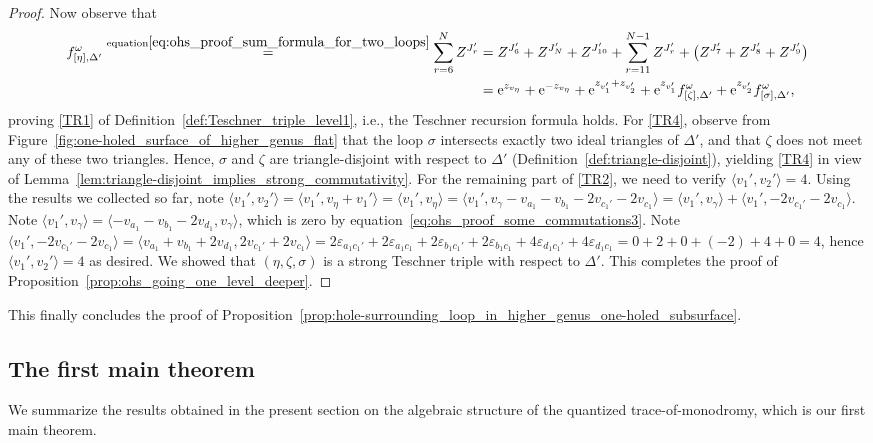 \documentclass[10pt,a4paper]{amsart}
\numberwithin{equation}{section}
\theoremstyle{definition}
\begin{document}
\begin{proof}
Now observe that
\begin{align*}
f^\omega_{[\eta],\Delta'} \stackrel{{\rm equation} \eqref{eq:ohs_proof_sum_formula_for_two_loops}}{=}
\sum_{r=6}^{N} Z^{J_r'}
& = Z^{J_6'} + Z^{J_N'} +Z^{J_{10}'} + \sum_{r=11}^{N-1} Z^{J_r'} + \bigl(Z^{J_7'} + Z^{J_8'} + Z^{J_9'}\bigr)
 \\
& = {\rm e}^{z_{v_\eta}} + {\rm e}^{-z_{v_\eta}} + {\rm e}^{z_{v_1'} + z_{v_2'}} + {\rm e}^{z_{v_1'}} f^\omega_{[\zeta],\Delta'} + {\rm e}^{z_{v_2'}} f^\omega_{[\sigma],\Delta'},
\end{align*}
proving \ref{TR1} of Definition~\ref{def:Teschner_triple_level1}, i.e., the Teschner recursion formula holds.
For \ref{TR4}, observe from Figure~\ref{fig:one-holed_surface_of_higher_genus_flat} that the loop $\sigma$ intersects exactly two ideal triangles of $\Delta'$, and that $\zeta$ does not meet any of these two triangles. Hence, $\sigma$ and $\zeta$ are triangle-disjoint with respect to $\Delta'$ (Definition~\ref{def:triangle-disjoint}), yielding \ref{TR4} in view of Lemma~\ref{lem:triangle-disjoint_implies_strong_commutativity}.
For the remaining part of \ref{TR2}, we need to verify $\langle v_1' , v_2'\rangle=4$. Using the results we collected so far, note $\langle v_1' , v_2'\rangle = \langle v_1', v_\eta + v_1'\rangle = \langle v_1', v_\eta\rangle = \langle v_1', v_\gamma - v_{a_1} - v_{b_1} - 2v_{c_1'} - 2v_{c_1}\rangle = \langle v_1', v_\gamma\rangle + \langle v_1', -2 v_{c_1'} -2 v_{c_1}\rangle$. Note $\langle v_1', v_\gamma \rangle = \langle -v_{a_1}-v_{b_1}-2v_{d_1},v_\gamma \rangle$, which is zero by equation~\eqref{eq:ohs_proof_some_commutations3}. Note $\langle v_1', -2v_{c_1'} - 2v_{c_1}\rangle = \langle v_{a_1}+v_{b_1}+2v_{d_1}, 2v_{c_1'} + 2v_{c_1}\rangle =2\varepsilon_{a_1 c_1'} + 2\varepsilon_{a_1 c_1} + 2\varepsilon_{b_1 c_1'} + 2 \varepsilon_{b_1 c_1} + 4 \varepsilon_{d_1 c_1'} + 4 \varepsilon_{d_1 c_1} =0+2+0+(-2)+4+0=4$, hence $\langle v_1',v_2'\rangle=4$ as desired.
We showed that $(\eta,\zeta,\sigma)$ is a strong Teschner triple with respect to $\Delta'$.
This completes the proof of Proposition~\ref{prop:ohs_going_one_level_deeper}.
\end{proof}
This finally concludes the proof of Proposition~\ref{prop:hole-surrounding_loop_in_higher_genus_one-holed_subsurface}.
\subsection{The first main theorem}
We summarize the results obtained in the present section on the algebraic structure of the quantized trace-of-monodromy, which is our first main theorem.
\end{document}
